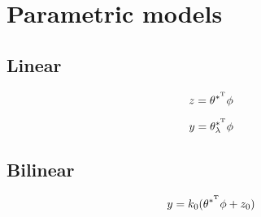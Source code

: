 \section{Parametric models}

\subsection{Linear}
\begin{equation}
	z = \theta^{*^{\scriptscriptstyle \mathrm{T}}} \phi
\end{equation}

\begin{equation}
	y = \theta_\lambda^{*^{\scriptscriptstyle \mathrm{T}}} \phi
\end{equation}

\subsection{Bilinear}
\begin{equation}
	y = k_0 (\theta^{*^{\scriptscriptstyle \mathrm{T}}} \phi + z_0)
\end{equation}